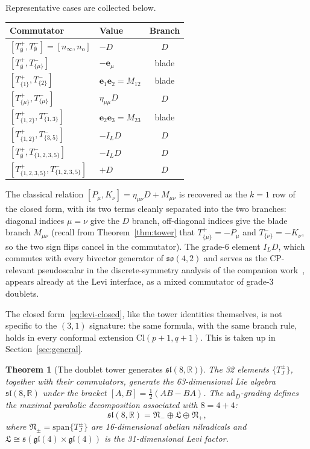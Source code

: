 \documentclass{birkjour}
\newtheorem{thm}{Theorem}[section]
\theoremstyle{definition}
\theoremstyle{remark}
\numberwithin{equation}{section}
\newcommand{\Cl}{\mathrm{Cl}}
\newcommand{\so}{\mathfrak{so}}
\newcommand{\slR}{\mathfrak{sl}}
\newcommand{\glR}{\mathfrak{gl}}
\newcommand{\fkN}{\mathfrak{N}}
\newcommand{\fkL}{\mathfrak{L}}
\newcommand{\e}[1]{\bm{e}_{#1}}
\newcommand{\no}{n_{\mathrm{o}}}
\newcommand{\ninf}{n_{\infty}}
\newcommand{\R}{\mathbb{R}}
\newcommand{\ad}{\mathrm{ad}}
\newenvironment{revblock}{}{}
\begin{document}
\begin{revblock}
Representative cases are
collected below.
\begin{center}
\begin{tabular}{llc}
\toprule
\textbf{Commutator} & \textbf{Value} & \textbf{Branch}\\
\midrule
$[T^+_\emptyset,T^-_\emptyset]=[\ninf,\no]$ & $-D$ & $D$\\
$[T^+_\emptyset,T^-_{\{\mu\}}]$ & $-\e{\mu}$ & blade\\
$[T^+_{\{1\}},T^-_{\{2\}}]$ & $\e{1}\e{2}=M_{12}$ & blade\\
$[T^+_{\{\mu\}},T^-_{\{\mu\}}]$ & $\eta_{\mu\mu}D$ & $D$\\
$[T^+_{\{1,2\}},T^-_{\{1,3\}}]$ & $\e{2}\e{3}=M_{23}$ & blade\\
$[T^+_{\{1,2\}},T^-_{\{3,5\}}]$ & $-I_LD$ & $D$\\
$[T^+_\emptyset,T^-_{\{1,2,3,5\}}]$ & $-I_LD$ & $D$\\
$[T^+_{\{1,2,3,5\}},T^-_{\{1,2,3,5\}}]$ & $+D$ & $D$\\
\bottomrule
\end{tabular}
\end{center}
The classical relation
$[P_\mu,K_\nu]=\eta_{\mu\nu}D+M_{\mu\nu}$ is recovered as
the $k=1$ row of the closed form, with its two terms cleanly
separated into the two branches: diagonal indices $\mu=\nu$
give the $D$ branch, off-diagonal indices give the blade
branch $M_{\mu\nu}$ (recall from Theorem~\ref{thm:tower}
that $T^+_{\{\mu\}}=-P_\mu$ and $T^-_{\{\nu\}}=-K_\nu$, so
the two sign flips cancel in the commutator).
The grade-6 element $I_LD$, which commutes with every
bivector generator of $\so(4,2)$ and serves as the
CP-relevant pseudoscalar in the discrete-symmetry analysis
of the companion work~\cite{HansenCPT2026}, appears already
at the Levi interface, as a mixed commutator of grade-3
doublets.
\end{revblock}

\begin{revblock}
The closed form~\eqref{eq:levi-closed}, like the tower
identities themselves, is not specific to the $(3,1)$
signature: the same formula, with the same branch rule,
holds in every conformal extension $\Cl(p+1,q+1)$. This is
taken up in Section~\ref{sec:general}.
\end{revblock}

\begin{thm}[The doublet tower generates
$\slR(8,\R)$]\label{thm:sl8}
The 32 elements $\{T^\pm_J\}$, together with their
commutators, generate the 63-dimensional Lie algebra
$\slR(8,\R)$ under the bracket
$[A,B]=\tfrac12(AB-BA)$.
The $\ad_D$-grading defines the maximal parabolic
decomposition associated with $8=4+4$:
\begin{equation}\label{eq:parabolic}
\slR(8,\R)
=\fkN_-\oplus\fkL\oplus\fkN_+,
\end{equation}
where $\fkN_\pm=\mathrm{span}\{T^\pm_J\}$ are
16-dimensional abelian nilradicals and
$\fkL\cong\mathfrak{s}(\glR(4)\times\glR(4))$
is the 31-dimensional Levi factor.
\end{thm}
\end{document}

